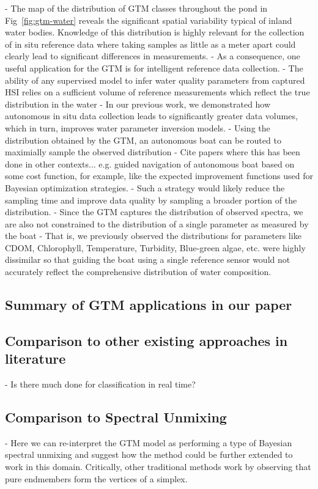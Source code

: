 \documentclass[remotesensing,article,submit,pdftex,moreauthors]{Definitions/mdpi}
\begin{document}
- The map of the distribution of GTM classes throughout the pond in Fig~\ref{fig:gtm-water} reveals the significant spatial variability typical of inland water bodies. Knowledge of this distribution is highly relevant for the collection of in situ reference data where taking samples as little as a meter apart could clearly lead to significant differences in measurements. 
- As a consequence, one useful application for the GTM is for intelligent reference data collection.
- The ability of any supervised model to infer water quality parameters from captured HSI relies on a sufficient volume of reference measurements which reflect the true distribution in the water
- In our previous work, we demonstrated how autonomous in situ data collection leads to significantly greater data volumes, which in turn, improves water parameter inversion models. 
- Using the distribution obtained by the GTM, an autonomous boat can be routed to maximially sample the observed distribution
- Cite papers where this has been done in other contexts... e.g. guided navigation of autonomous boat based on some cost function, for example, like the expected improvement functions used for Bayesian optimization strategies.
- Such a strategy would likely reduce the sampling time and improve data quality by sampling a broader portion of the distribution. 
- Since the GTM captures the distribution of observed spectra, we are also not constrained to the distribution of a single parameter as measured by the boat
- That is, we previously observed the distributions for parameters like CDOM, Chlorophyll, Temperature, Turbidity, Blue-green algae, etc. were highly dissimilar so that guiding the boat using a single reference sensor would not accurately reflect the comprehensive distribution of water composition.

\subsection{Summary of GTM applications in our paper}
\subsection{Comparison to other existing approaches in literature}
- Is there much done for classification in real time? 
\subsection{Comparison to Spectral Unmixing}
- Here we can re-interpret the GTM model as performing a type of Bayesian spectral unmixing and suggest how the method could be further extended to work in this domain. Critically, other traditional methods work by observing that pure endmembers form the vertices of a simplex. 
\end{document}
